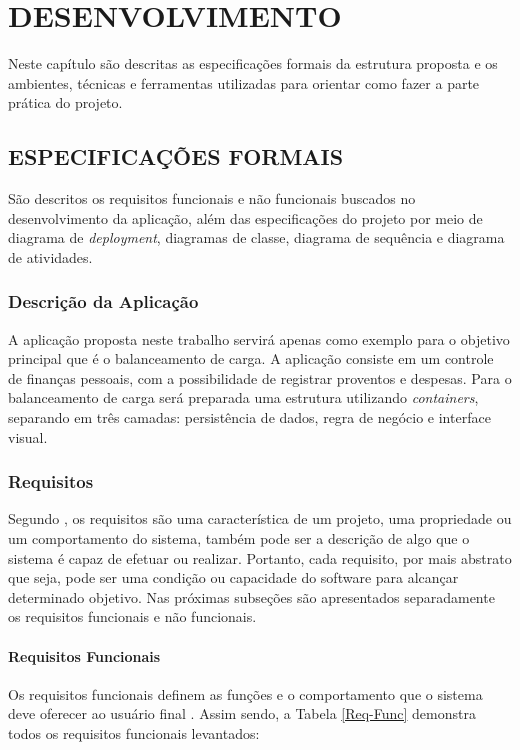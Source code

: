 \chapter{DESENVOLVIMENTO}

Neste capítulo são descritas as especificações formais da estrutura proposta e os ambientes, técnicas e ferramentas utilizadas para orientar como fazer a parte prática do projeto. 

\section{ESPECIFICAÇÕES FORMAIS}
São descritos os requisitos funcionais e não funcionais buscados no desenvolvimento da aplicação, além das especificações do projeto por meio de diagrama de \textit{deployment}, diagramas de classe, diagrama de sequência e diagrama de atividades.

\subsection{Descrição da Aplicação}
A aplicação proposta neste trabalho servirá apenas como exemplo para o objetivo principal que é o balanceamento de carga. A aplicação consiste em um controle de finanças pessoais, com a possibilidade de registrar proventos e despesas. Para o balanceamento de carga será preparada uma estrutura utilizando \textit{containers}, separando em três camadas: persistência de dados, regra de negócio e interface visual.

\subsection{Requisitos}
Segundo \cite{Pfleeger}, os requisitos são uma característica de um projeto, uma propriedade ou um comportamento do sistema, também pode ser a descrição de algo que o sistema é capaz de efetuar ou realizar. Portanto, cada requisito, por mais abstrato que seja,
pode ser uma condição ou capacidade do software para alcançar determinado objetivo. Nas próximas subseções são apresentados separadamente os requisitos funcionais e não
funcionais.

\subsubsection{Requisitos Funcionais}
Os requisitos funcionais definem as funções e o comportamento que o sistema deve oferecer ao usuário final \cite{Pressman}. Assim sendo, a Tabela \ref{Req-Func} demonstra todos os requisitos funcionais levantados:

